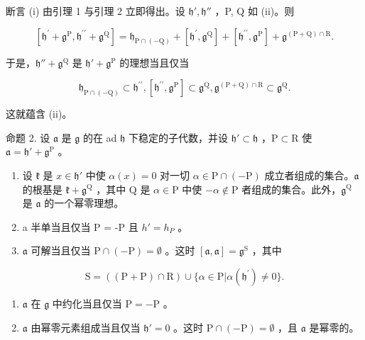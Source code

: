 断言 (i) 由引理 1 与引理 2 立即得出。设 \(\mathfrak{h}',\mathfrak{h}''\) ，P, Q 如 (ii)。则

\[
[ \mathfrak {h} ^ {\prime} + \mathfrak {g} ^ {\mathrm{P}}, \mathfrak {h} ^ {\prime \prime} + \mathfrak {g} ^ {\mathrm{Q}} ] = \mathfrak {h} _ {\mathrm{P} \cap (- \mathrm{Q})} + [ \mathfrak {h} ^ {\prime}, \mathfrak {g} ^ {\mathrm{Q}} ] + [ \mathfrak {h} ^ {\prime \prime}, \mathfrak {g} ^ {\mathrm{P}} ] + \mathfrak {g} ^ {(\mathrm{P} + \mathrm{Q}) \cap \mathrm{R}}.
\]

于是，\(\mathfrak{h}'' + \mathfrak{g}^{\mathrm{Q}}\) 是 \(\mathfrak{h}' + \mathfrak{g}^{\mathrm{P}}\) 的理想当且仅当

\[
\mathfrak {h} _ {\mathrm{P} \cap (- \mathrm{Q})} \subset \mathfrak {h} ^ {\prime \prime}, [ \mathfrak {h} ^ {\prime \prime}, \mathfrak {g} ^ {\mathrm{P}} ] \subset \mathfrak {g} ^ {\mathrm{Q}}, \mathfrak {g} ^ {(\mathrm{P} + \mathrm{Q}) \cap \mathrm{R}} \subset \mathfrak {g} ^ {\mathrm{Q}}.
\]

这就蕴含 (ii)。

命题 2. 设 \(\mathfrak{a}\) 是 \(\mathfrak{g}\) 的在 ad \(\mathfrak{h}\) 下稳定的子代数，并设 \(\mathfrak{h}' \subset \mathfrak{h}\) ，\(\mathrm{P} \subset \mathrm{R}\) 使 \(\mathfrak{a} = \mathfrak{h}' + \mathfrak{g}^{\mathrm{P}}\) 。

\begin{enumerate}
\def\labelenumi{(\roman{enumi})}
\item
  设 \(\mathfrak{k}\) 是 \(x\in \mathfrak{h}'\) 中使 \(\alpha (x) = 0\) 对一切 \(\alpha \in \mathrm{P}\cap (-\mathrm{P})\) 成立者组成的集合。\(\mathfrak{a}\) 的根基是 \(\mathfrak{k} + \mathfrak{g}^{\mathrm{Q}}\) ，其中 \(\mathrm{Q}\) 是 \(\alpha \in \mathrm{P}\) 中使 \(-\alpha \notin \mathrm{P}\) 者组成的集合。此外，\(\mathfrak{g}^{\mathrm{Q}}\) 是 \(\mathfrak{a}\) 的一个幂零理想。
\item
  a 半单当且仅当 P = -P 且 \(h' = h_{P}\) 。
\item
  \(\mathfrak{a}\) 可解当且仅当 \(\mathrm{P} \cap (-\mathrm{P}) = \emptyset\) 。这时 \([\mathfrak{a}, \mathfrak{a}] = \mathfrak{g}^{\mathrm{S}}\) ，其中
\end{enumerate}

\[
\mathrm{S} = ((\mathrm{P} + \mathrm{P}) \cap \mathrm{R}) \cup \{\alpha \in \mathrm{P} | \alpha (\mathfrak {h} ^ {\prime}) \neq 0 \}.
\]

\begin{enumerate}
\def\labelenumi{(\roman{enumi})}
\setcounter{enumi}{3}
\item
  \(\mathfrak{a}\) 在 \(\mathfrak{g}\) 中约化当且仅当 \(\mathrm{P} = -\mathrm{P}\) 。
\item
  \(\mathfrak{a}\) 由幂零元素组成当且仅当 \(\mathfrak{h}' = 0\) 。这时 \(\mathrm{P} \cap (-\mathrm{P}) = \emptyset\) ，且 \(\mathfrak{a}\) 是幂零的。
\end{enumerate}

